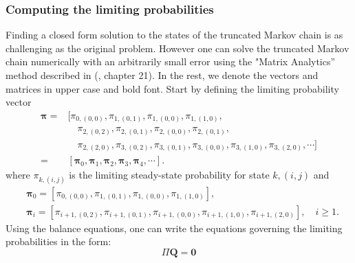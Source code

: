 \documentclass[sigconf,draft]{acmart}
\begin{document}
\subsubsection{Computing the limiting probabilities}
Finding a closed form solution to the states of the truncated Markov chain is as challenging as the original problem. However one can solve the truncated Markov chain numerically with an arbitrarily small error using the "Matrix Analytics'' method described in (\cite{MorHB13}, chapter 21).
In the rest, we denote the vectors and matrices in upper case and bold font. Start by defining the limiting probability vector
\begin{equation*}
  \begin{split}
    \bm{\pi} =& [\pi_{0,(0,0)}, \pi_{1,(0,1)}, \pi_{1,(0,0)}, \pi_{1,(1,0)}, \\
    & \quad \pi_{2,(0,2)}, \pi_{2,(0,1)}, \pi_{2,(0,0)}, \pi_{2,(0,1)}, \\
	& \quad \pi_{2,(2,0)}, \pi_{3,(0,2)}, \pi_{3,(0,1)}, \pi_{3,(0,0)}, \pi_{3,(1,0)} ,\pi_{3,(2,0)}, \cdots] \\
    =& [\bm{\pi}_0, \bm{\pi}_1, \bm{\pi}_2, \bm{\pi}_3, \bm{\pi}_4, \cdots].
  \end{split}
\end{equation*}
where $\pi_{k,(i,j)}$ is the limiting steady-state probability for state $k,(i,j)$ and 
\begin{equation*}
  \begin{split}
    & \bm{\pi}_0 = [\pi_{0,(0,0)}, \pi_{1,(0,1)}, \pi_{1,(0,0)}, \pi_{1,(1,0)}], \\
    & \bm{\pi}_i = [\pi_{i+1,(0,2)}, \pi_{i+1,(0,1)}, \pi_{i+1,(0,0)}, \pi_{i+1,(1,0)}, \pi_{i+1,(2,0)}], \quad i \geq 1.
  \end{split}
\end{equation*}
Using the balance equations, one can write the equations governing the limiting probabilities in the form:
\begin{equation}
  \label{eq:eq_balance_eq}
  \Pi\bm{Q} = \bm{0}
\end{equation}
\end{document}
